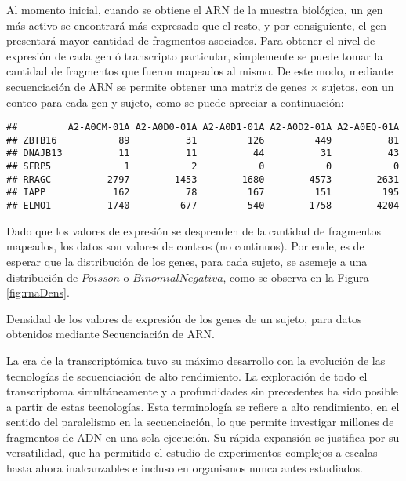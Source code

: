 \documentclass[12pt,twoside]{reedthesis}
\begin{document}
\par

Al momento inicial, cuando se obtiene el ARN de la muestra biológica, un gen más activo se encontrará más expresado que el resto, y por consiguiente, el gen presentará mayor cantidad de fragmentos asociados. Para obtener el nivel de expresión de cada gen ó transcripto particular, simplemente se puede tomar la cantidad de fragmentos que fueron mapeados al mismo. De este modo, mediante secuenciación de ARN se permite obtener una matriz de genes \(\times\) sujetos, con un conteo para cada gen y sujeto, como se puede apreciar a continuación:
\begin{verbatim}
##         A2-A0CM-01A A2-A0D0-01A A2-A0D1-01A A2-A0D2-01A A2-A0EQ-01A
## ZBTB16           89          31         126         449          81
## DNAJB13          11          11          44          31          43
## SFRP5             1           2           0           0           0
## RRAGC          2797        1453        1680        4573        2631
## IAPP            162          78         167         151         195
## ELMO1          1740         677         540        1758        4204
\end{verbatim}
Dado que los valores de expresión se desprenden de la cantidad de fragmentos mapeados, los datos son valores de conteos (no continuos). Por ende, es de esperar que la distribución de los genes, para cada sujeto, se asemeje a una distribución de \(Poisson\) o \(Binomial Negativa\), como se observa en la Figura \ref{fig:rnaDens}.

Densidad de los valores de expresión de los genes de un sujeto, para datos obtenidos mediante Secuenciación de ARN.

\par

La era de la transcriptómica tuvo su máximo desarrollo con la evolución de las tecnologías de secuenciación de alto rendimiento. La exploración de todo el transcriptoma simultáneamente y a profundidades sin precedentes ha sido posible a partir de estas tecnologías. Esta terminología se refiere a alto rendimiento, en el sentido del paralelismo en la secuenciación, lo que permite investigar millones de fragmentos de ADN en una sola ejecución. Su rápida expansión se justifica por su versatilidad, que ha permitido el estudio de experimentos complejos a escalas hasta ahora inalcanzables e incluso en organismos nunca antes estudiados.

\par
\end{document}
